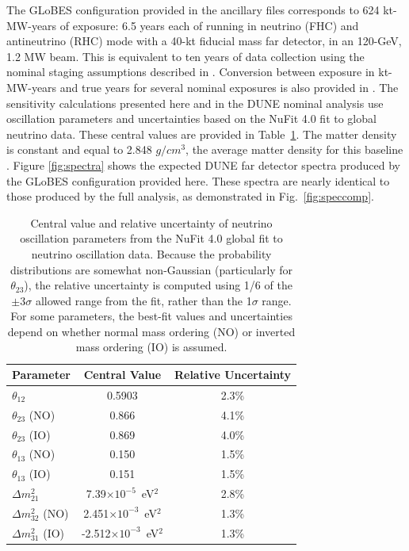 \documentclass[aps,prd,superscriptaddress]{revtex4-1}
\begin{document}
The GLoBES configuration provided in the ancillary files corresponds to 624 kt-MW-years of exposure: 
6.5 years each of running in neutrino (FHC) and antineutrino (RHC)
mode with a 40-kt fiducial mass far detector, in an 120-GeV, 1.2 MW beam. This is equivalent to ten
years of data collection using the nominal staging assumptions described in \cite{Abi:2020qib}. Conversion between
exposure in kt-MW-years and true years for several nominal exposures is also provided in \cite{Abi:2020qib}.
The sensitivity calculations presented here and in the DUNE nominal analysis \cite{Abi:2020qib}
use oscillation parameters and uncertainties based on the NuFit
4.0\cite{Esteban:2018azc,nufitweb} fit to global neutrino data.
These central values are provided in Table~\ref{tab:oscpar_nufit}.
The matter density is constant and equal to 2.848 $g/cm^{3}$, the average matter density for this baseline
\cite{doi:10.1002/2016JB012887,Roe:2017zdw}.
Figure \ref{fig:spectra} shows the expected DUNE far detector spectra produced by the GLoBES configuration
provided here. These spectra are nearly identical to those produced by the full analysis, as demonstrated in
Fig.~\ref{fig:speccomp}.


\begin{table}[!htb]
\centering
\caption{Central value and relative uncertainty of neutrino oscillation parameters from the
  NuFit 4.0 \cite{Esteban:2018azc,nufitweb}
  global fit to neutrino oscillation data. Because the probability distributions are somewhat non-Gaussian
  (particularly for $\theta_{23}$), the relative uncertainty is computed using 1/6 of the $\pm3\sigma$ allowed range
  from the fit, rather than the 1$\sigma$ range.   For some parameters, the best-fit values
  and uncertainties depend on whether normal mass ordering (NO) or inverted mass ordering (IO) is assumed.}
\label{tab:oscpar_nufit}
\begin{tabular}{|lcc|} \hline \hline
Parameter &    Central Value & Relative Uncertainty \\ \hline
$\theta_{12}$ & 0.5903 & 2.3\% \\ \hline
$\theta_{23}$ (NO) & 0.866  & 4.1\% \\ 
$\theta_{23}$ (IO) & 0.869  & 4.0\% \\ \hline
$\theta_{13}$ (NO) & 0.150  & 1.5\% \\
$\theta_{13}$ (IO) & 0.151  & 1.5\% \\ \hline
$\Delta m^2_{21}$ & 7.39$\times10^{-5}$~eV$^2$ & 2.8\% \\  \hline
$\Delta m^2_{32}$ (NO) & 2.451$\times10^{-3}$~eV$^2$ &  1.3\% \\ 
$\Delta m^2_{31}$ (IO) & -2.512$\times10^{-3}$~eV$^2$ &  1.3\% \\ \hline \hline
\end{tabular}
\end{table}
\end{document}
